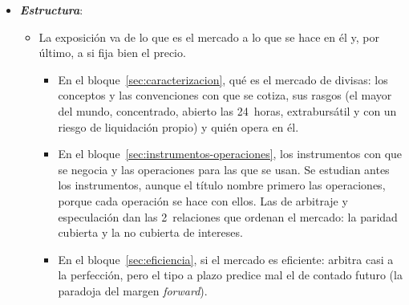 \documentclass[11pt]{article}
\begin{document}
\begin{itemize}
\item \textbf{\emph{Estructura}}:
  \begin{itemize}
  \item La exposición va de lo que es el mercado a lo que se hace en él y, por último, a si fija bien el precio.
  \begin{itemize}
  \item En el bloque~\ref{sec:caracterizacion}, qué es el mercado de divisas: los conceptos y las convenciones con que se cotiza, sus rasgos (el mayor del mundo, concentrado, abierto las 24~horas, extrabursátil y con un riesgo de liquidación propio) y quién opera en él.
  \item En el bloque~\ref{sec:instrumentos-operaciones}, los instrumentos con que se negocia y las operaciones para las que se usan. Se estudian antes los instrumentos, aunque el título nombre primero las operaciones, porque cada operación se hace con ellos. Las de arbitraje y especulación dan las 2~relaciones que ordenan el mercado: la paridad cubierta y la no cubierta de intereses.
  \item En el bloque~\ref{sec:eficiencia}, si el mercado es eficiente: arbitra casi a la perfección, pero el tipo a plazo predice mal el de contado futuro (la paradoja del margen \emph{forward}).
  \end{itemize}
  \end{itemize}
\end{itemize}
\end{document}
